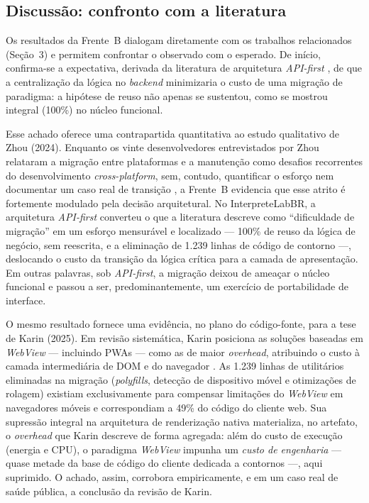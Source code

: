 \subsection{Discussão: confronto com a literatura}
\label{sub:discussao}

Os resultados da Frente~B dialogam diretamente com os trabalhos relacionados
(Seção~3) e permitem confrontar o observado com o esperado. De início, confirma-se
a expectativa, derivada da literatura de arquitetura \emph{API-first}
\cite{rampinelli2026}, de que a centralização da lógica no \emph{backend}
minimizaria o custo de uma migração de paradigma: a hipótese de reuso não apenas se
sustentou, como se mostrou integral (100\%) no núcleo funcional.

Esse achado oferece uma contrapartida quantitativa ao estudo qualitativo de Zhou
(2024). Enquanto os vinte desenvolvedores entrevistados por Zhou relataram a
migração entre plataformas e a manutenção como desafios recorrentes do
desenvolvimento \emph{cross-platform}, sem, contudo, quantificar o esforço nem
documentar um caso real de transição \cite{zhou2024}, a Frente~B evidencia que esse
atrito é fortemente modulado pela decisão arquitetural. No InterpreteLabBR, a
arquitetura \emph{API-first} converteu o que a literatura descreve como
``dificuldade de migração'' em um esforço mensurável e localizado --- 100\% de
reuso da lógica de negócio, sem reescrita, e a eliminação de 1.239 linhas de
código de contorno ---, deslocando o custo da transição da lógica crítica para a
camada de apresentação. Em outras palavras, sob \emph{API-first}, a migração
deixou de ameaçar o núcleo funcional e passou a ser, predominantemente, um
exercício de portabilidade de interface.

O mesmo resultado fornece uma evidência, no plano do código-fonte, para a tese de
Karin (2025). Em revisão sistemática, Karin posiciona as soluções baseadas em
\emph{WebView} --- incluindo PWAs --- como as de maior \emph{overhead}, atribuindo
o custo à camada intermediária de DOM e do navegador \cite{karin2025}. As 1.239
linhas de utilitários eliminadas na migração (\emph{polyfills}, detecção de
dispositivo móvel e otimizações de rolagem) existiam exclusivamente para compensar
limitações do \emph{WebView} em navegadores móveis e correspondiam a 49\% do código
do cliente web. Sua supressão integral na arquitetura de renderização nativa
materializa, no artefato, o \emph{overhead} que Karin descreve de forma agregada:
além do custo de execução (energia e CPU), o paradigma \emph{WebView} impunha um
\emph{custo de engenharia} --- quase metade da base de código do cliente dedicada a
contornos ---, aqui suprimido. O achado, assim, corrobora empiricamente, e em um
caso real de saúde pública, a conclusão da revisão de Karin.

